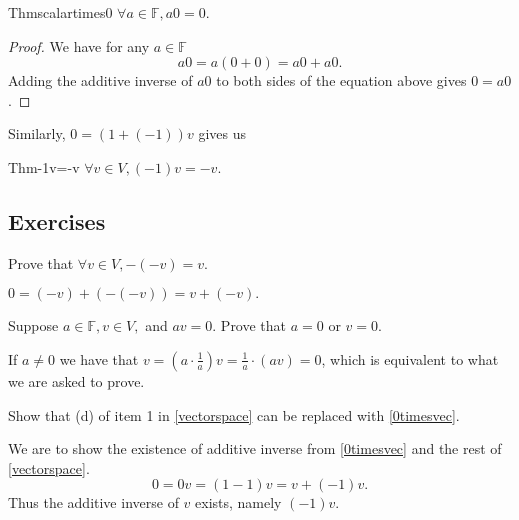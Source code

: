 \begin{reference}{Thm}{scalartimes0}
  $\forall a\in \mathbb F, a0=0.$
\end{reference}

\begin{proof}
  We have for any $a\in \mathbb F$
  \[
    a0=a(0+0)=a0+a0.
  \]
  Adding the additive inverse of $a0$ to both sides of the equation above gives $0=a0$.
\end{proof}

Similarly, $0=(1+(-1))v$ gives us

\begin{reference}{Thm}{-1v=-v}
  $\forall v\in V, (-1)v=-v.$
\end{reference}

\subsection*{Exercises}

\begin{exercise}
  Prove that $\forall v\in V, -(-v)=v.$
\end{exercise}

$0=(-v)+(-(-v))=v+(-v).$

\begin{exercise}
  Suppose $a\in \mathbb F,v\in V,$ and $av=0.$ Prove that $a=0$ or $v=0$.
\end{exercise}

If $a\neq0$ we have that $v=(a\cdot \frac{1}{a})v=\frac{1}{a}\cdot(av)=0$, which is equivalent to what we are asked to prove.

\setcounter{exercise}{4}

\begin{exercise}
  Show that (d) of item 1 in \ref{vectorspace} can be replaced with \ref{0timesvec}.
\end{exercise}

We are to show the existence of additive inverse from \ref{0timesvec} and the rest of \ref{vectorspace}.
\[
  0=0v=(1-1)v=v+(-1)v.
\]
Thus the additive inverse of $v$ exists, namely $(-1)v$.

